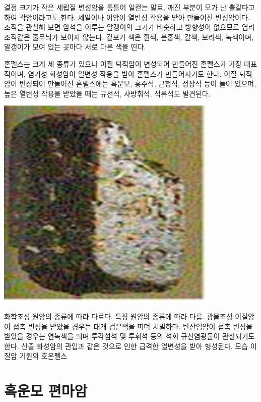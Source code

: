 \documentclass[12pt, a4paper, twoside]{book}
\begin{document}
결정 크기가 작은 세립질 변성암을 통틀어 일컫는 말로, 깨진 부분이 모가 난 뿔같다고 하여 각암이라고도 한다. 셰일이나 이암이 열변성 작용을 받아 만들어진 변성암이다. 조직을 관찰해 보면 암석을 이루는 알갱이의 크기가 비슷하고 방향성이 없으므로 엽리 조직같은 줄무늬가 보이지 않는다. 겉보기 색은 흰색, 분홍색, 갈색, 보라색, 녹색이며, 알갱이가 모여 있는 곳마다 서로 다른 색을 띤다. 

혼펠스는 크게 세 종류가 있으나 이질 퇴적암이 변성되어 만들어진 혼펠스가 가장 대표적이며, 염기성 화성암이 열변성 작용을 받아 혼펠스가 만들어지기도 한다. 이질 퇴적암이 변성되어 만들어진 혼펠스에는 흑운모, 홍주석, 근청석, 정장석 등이 들어 있으며, 높은 열변성 작용을 받았을 때는 규선석, 사방휘석, 석류석도 발견된다.

				\begin{center}
				\includegraphics[width=0.8\textwidth]{./fig/Hornfels_0001.jpg}
				\end{center}



화학조성
원암의 종류에 따라 다르다.
특징
원암의 종류에 따라 다름.
광물조성
이질암이 접촉 변성을 받았을 경우는 대개 검은색을 띠며 치밀하다. 탄산염암이 접촉 변성을 받았을 경우는 연녹색을 띄며 투각섬석 및 투휘석 등의 석회 규산염광물이 관찰되기도 한다.
산출
화성암의 관입과 같은 것으로 인한 급격한 열변성을 받아 형성된다.
모습
이질암 기원의 호온펠스



	\clearpage
	\section{흑운모 편마암}
	
\end{document}
